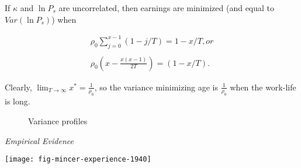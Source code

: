 \begin{frame}
	If $\kappa$ and $\ln{P_s}$ are uncorrelated, then earnings are minimized (and equal to $Var(\ln{P_s})$)
	when

	\begin{align*}
	\rho_0 \sum^{x - 1}_{j=0} (1 - j/T) = 1 - x/T, or \\
	\\
	\rho_0\left(x - \frac{x(x - 1)}{2T}\right) = (1 - x/T).
	\end{align*}
\end{frame}
\begin{frame}
	Clearly, $\lim_{T\to\infty} x^* = \frac{1}{\rho_0}$, so the variance minimizing age is $\frac{1}{\rho_0}$ when the work-life is long.
\end{frame}
\begin{frame}
\begin{figure}[htp]\centering
\caption{Variance profiles}
\end{figure}
\end{frame}
\begin{frame}\begin{center}
\LARGE\textit{Empirical Evidence}
\end{center}\end{frame}
\begin{frame}[plain]
\begin{center}
\texttt{[image: fig-mincer-experience-1940]}
\end{center}
\end{frame}
